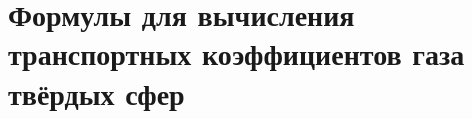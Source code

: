 
\chapter{Формулы для вычисления транспортных коэффициентов газа твёрдых сфер} \label{app:coefficients}



